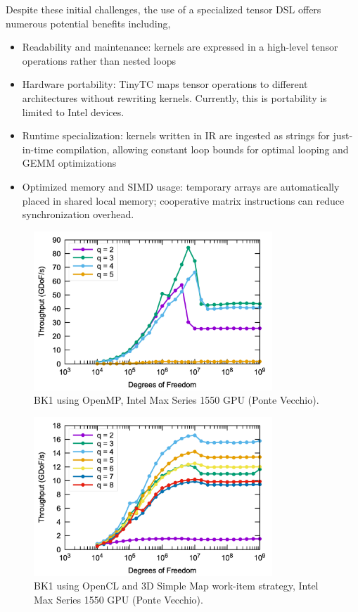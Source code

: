 \documentclass[a4paper,12pt]{article}
\begin{document}
Despite these initial challenges, the use of a specialized tensor DSL offers numerous potential benefits including,
\begin{itemize}
\item Readability and maintenance: kernels are expressed in a high-level tensor operations rather than nested loops
\item Hardware portability: TinyTC maps tensor operations to different architectures without rewriting kernels. Currently, this is portability is limited to Intel devices.
\item Runtime specialization: kernels written in IR are ingested as strings for just-in-time compilation, allowing constant loop bounds for optimal looping and GEMM optimizations
\item Optimized memory and SIMD usage: temporary arrays are automatically placed in shared local memory; cooperative matrix instructions can reduce synchronization overhead.
\end{itemize}




\begin{figure}[htbp]
  \centering
  \includegraphics[width=0.8\textwidth]{pvc_openmp} %
  \caption{BK1 using OpenMP, Intel Max Series 1550 GPU (Ponte Vecchio).}
  \label{fig:pvc_openmp}
\end{figure}

\begin{figure}[htbp]
  \centering
  \includegraphics[width=0.8\textwidth]{pvc_opencl} %
  \caption{BK1 using OpenCL and 3D Simple Map work-item strategy, Intel Max Series 1550 GPU (Ponte Vecchio).}
  \label{fig:pvc_opencl}
\end{figure}
\end{document}
